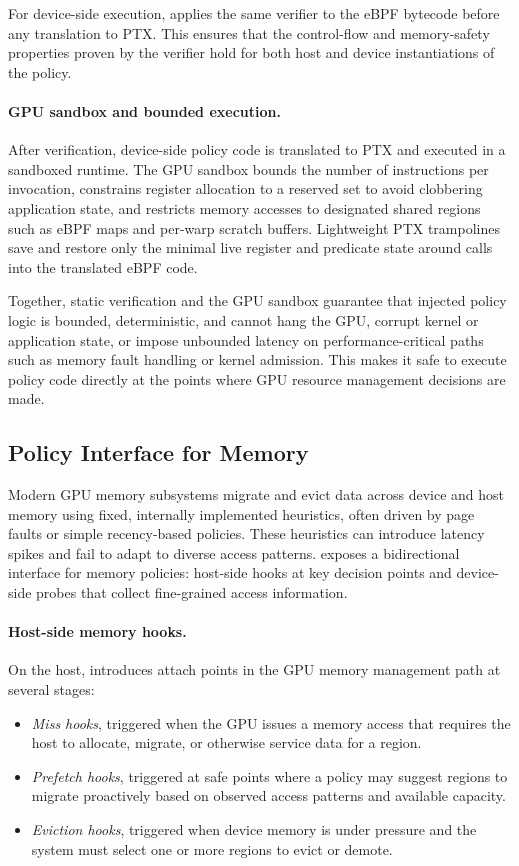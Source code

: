 For device-side execution, \sys applies the same verifier to the eBPF bytecode
before any translation to PTX. This ensures that the control-flow and memory-safety
properties proven by the verifier hold for both host and device instantiations of
the policy.

\paragraph{GPU sandbox and bounded execution.}
After verification, device-side policy code is translated to PTX and executed in a
sandboxed runtime. The GPU sandbox bounds the number of instructions per invocation,
constrains register allocation to a reserved set to avoid clobbering application
state, and restricts memory accesses to designated shared regions such as eBPF maps
and per-warp scratch buffers. Lightweight PTX trampolines save and restore only the
minimal live register and predicate state around calls into the translated eBPF code.

Together, static verification and the GPU sandbox guarantee that injected policy
logic is bounded, deterministic, and cannot hang the GPU, corrupt kernel or application
state, or impose unbounded latency on performance-critical paths such as memory
fault handling or kernel admission. This makes it safe to execute policy code
directly at the points where GPU resource management decisions are made.


\subsection{Policy Interface for Memory}
\label{sec:design-mem}

Modern GPU memory subsystems migrate and evict data across device and host memory
using fixed, internally implemented heuristics, often driven by page faults or
simple recency-based policies. These heuristics can introduce latency spikes and
fail to adapt to diverse access patterns. \sys exposes a bidirectional interface
for memory policies: host-side hooks at key decision points and device-side probes
that collect fine-grained access information.

\paragraph{Host-side memory hooks.}
On the host, \sys introduces attach points in the GPU memory management path at
several stages:

\begin{itemize}[leftmargin=*]
  \item \emph{Miss hooks}, triggered when the GPU issues a memory access that
        requires the host to allocate, migrate, or otherwise service data for
        a region.
  \item \emph{Prefetch hooks}, triggered at safe points where a policy may suggest
        regions to migrate proactively based on observed access patterns and
        available capacity.
  \item \emph{Eviction hooks}, triggered when device memory is under pressure and
        the system must select one or more regions to evict or demote.
\end{itemize}

